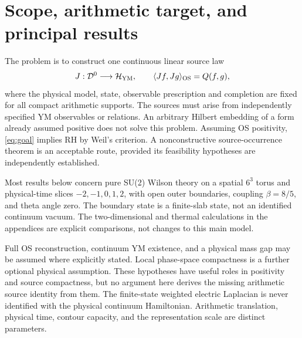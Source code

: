 \section{Scope, arithmetic target, and principal results}\label{sec:scope}

The problem is to construct one continuous linear source law
\begin{equation}\label{eq:goal}
J:\mathcal D^0\longrightarrow\mathcal H_{\rm YM},\qquad
\langle Jf,Jg\rangle_{\rm OS}=Q(f,g),
\end{equation}
where the physical model, state, observable prescription and completion
are fixed for all compact arithmetic supports. The sources must arise
from independently specified YM observables or relations. An arbitrary
Hilbert embedding of a form already assumed positive does not solve this
problem. Assuming OS positivity, \eqref{eq:goal} implies RH by Weil's
criterion. A nonconstructive source-occurrence theorem is an acceptable
route, provided its feasibility hypotheses are independently established.

Most results below concern pure SU(2) Wilson theory on a spatial
$6^3$ torus and physical-time slices $-2,-1,0,1,2$, with open outer
boundaries, coupling $\beta=8/5$, and theta angle zero. The boundary
state is a finite-slab state, not an identified continuum vacuum.
The two-dimensional and thermal calculations in the appendices are
explicit comparisons, not changes to this main model.

Full OS reconstruction, continuum YM existence, and a physical mass gap
\cite{jaffe-witten}
may be assumed where explicitly stated. Local phase-space compactness
is a further optional physical assumption. These hypotheses have useful
roles in positivity and source compactness, but no argument here derives
the missing arithmetic source identity from them. The finite-state
weighted electric Laplacian is never identified with the physical
continuum Hamiltonian. Arithmetic translation, physical time, contour
capacity, and the representation scale are distinct parameters.

